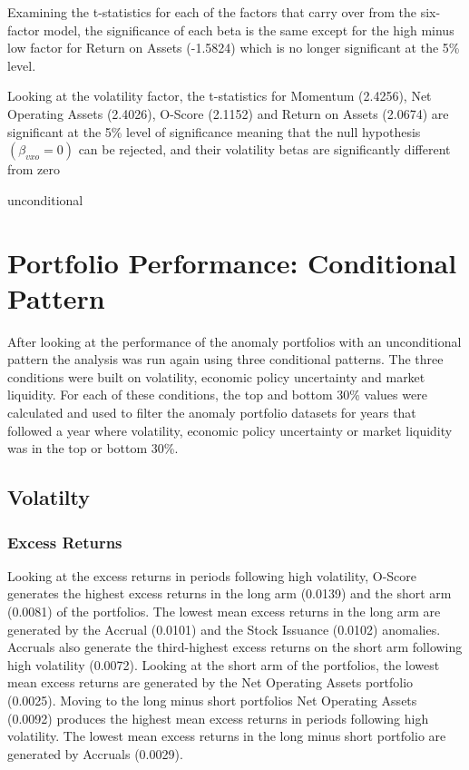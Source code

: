 \documentclass[a4paper,12pt]{article}                 %
\begin{document}
Examining the t-statistics for each of the factors that carry over from the six-factor model, the significance of each beta is the same except for the high minus low factor for Return on Assets (-1.5824) which is no longer significant at the 5\% level. 

Looking at the volatility factor, the t-statistics for Momentum (2.4256), Net Operating Assets (2.4026), O-Score (2.1152) and Return on Assets (2.0674) are significant at the 5\% level of significance meaning that the null hypothesis $(\beta_{vxo}= 0)$ can be rejected, and their volatility betas are significantly different from zero

{unconditional}

\section{Portfolio Performance: Conditional Pattern}
After looking at the performance of the anomaly portfolios with an unconditional pattern the analysis was run again using three conditional patterns. The three conditions were built on volatility, economic policy uncertainty and market liquidity. For each of these conditions, the top and bottom 30\% values were calculated and used to filter the anomaly portfolio datasets for years that followed a year where volatility, economic policy uncertainty or market liquidity was in the top or bottom 30\%.

\FloatBarrier
\subsection{Volatilty}
\subsubsection{Excess Returns}
Looking at the excess returns in periods following high volatility, O-Score generates the highest excess returns in the long arm (0.0139) and the short arm (0.0081) of the portfolios. The lowest mean excess returns in the long arm are generated by the Accrual (0.0101) and the Stock Issuance (0.0102) anomalies. Accruals also generate the third-highest excess returns on the short arm following high volatility (0.0072). Looking at the short arm of the portfolios, the lowest mean excess returns are generated by the Net Operating Assets portfolio (0.0025). Moving to the long minus short portfolios Net Operating Assets (0.0092) produces the highest mean excess returns in periods following high volatility. The lowest mean excess returns in the long minus short portfolio are generated by Accruals (0.0029).
\end{document}
